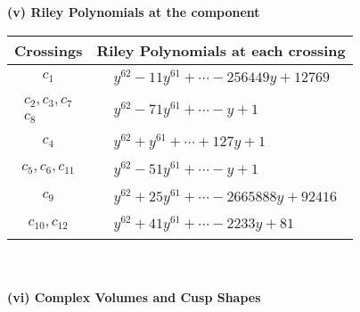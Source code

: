 \documentclass[1p]{elsarticle_modified}
\theoremstyle{definition}
\begin{document}
\newpage\renewcommand{\arraystretch}{1}
\flushleft \textbf{(v) Riley Polynomials at the component}\newline \\
\begin{tabular}{m{50pt}|m{274pt}}
Crossings & \hspace{64pt}Riley Polynomials at each crossing \\
\hline $$\begin{aligned}c_{1}\end{aligned}$$&$\begin{aligned}
&y^{62}-11 y^{61}+\cdots-256449 y+12769
\end{aligned}$\\
\hline $$\begin{aligned}c_{2},c_{3},c_{7}\\c_{8}\end{aligned}$$&$\begin{aligned}
&y^{62}-71 y^{61}+\cdots- y+1
\end{aligned}$\\
\hline $$\begin{aligned}c_{4}\end{aligned}$$&$\begin{aligned}
&y^{62}+y^{61}+\cdots+127 y+1
\end{aligned}$\\
\hline $$\begin{aligned}c_{5},c_{6},c_{11}\end{aligned}$$&$\begin{aligned}
&y^{62}-51 y^{61}+\cdots- y+1
\end{aligned}$\\
\hline $$\begin{aligned}c_{9}\end{aligned}$$&$\begin{aligned}
&y^{62}+25 y^{61}+\cdots-2665888 y+92416
\end{aligned}$\\
\hline $$\begin{aligned}c_{10},c_{12}\end{aligned}$$&$\begin{aligned}
&y^{62}+41 y^{61}+\cdots-2233 y+81
\end{aligned}$\\
\hline
\end{tabular}\\~\\
\newpage\flushleft \textbf{(vi) Complex Volumes and Cusp Shapes}
\end{document}
